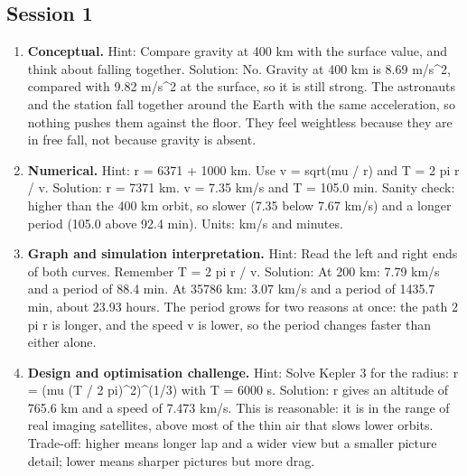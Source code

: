 \documentclass[11pt,a4paper]{article}
\begin{document}
\subsection*{Session 1}
\begin{enumerate}[nosep]
\item \textbf{Conceptual.} Hint: Compare gravity at 400 km with the surface value, and think about falling together. Solution: No. Gravity at 400 km is 8.69 m/s\textasciicircum{}2, compared with 9.82 m/s\textasciicircum{}2 at the surface, so it is still strong. The astronauts and the station fall together around the Earth with the same acceleration, so nothing pushes them against the floor. They feel weightless because they are in free fall, not because gravity is absent.
\item \textbf{Numerical.} Hint: r = 6371 + 1000 km. Use v = sqrt(mu / r) and T = 2 pi r / v. Solution: r = 7371 km. v = 7.35 km/s and T = 105.0 min. Sanity check: higher than the 400 km orbit, so slower (7.35 below 7.67 km/s) and a longer period (105.0 above 92.4 min). Units: km/s and minutes.
\item \textbf{Graph and simulation interpretation.} Hint: Read the left and right ends of both curves. Remember T = 2 pi r / v. Solution: At 200 km: 7.79 km/s and a period of 88.4 min. At 35786 km: 3.07 km/s and a period of 1435.7 min, about 23.93 hours. The period grows for two reasons at once: the path 2 pi r is longer, and the speed v is lower, so the period changes faster than either alone.
\item \textbf{Design and optimisation challenge.} Hint: Solve Kepler 3 for the radius: r = (mu (T / 2 pi)\textasciicircum{}2)\textasciicircum{}(1/3) with T = 6000 s. Solution: r gives an altitude of 765.6 km and a speed of 7.473 km/s. This is reasonable: it is in the range of real imaging satellites, above most of the thin air that slows lower orbits. Trade-off: higher means longer lap and a wider view but a smaller picture detail; lower means sharper pictures but more drag.
\end{enumerate}
\end{document}

